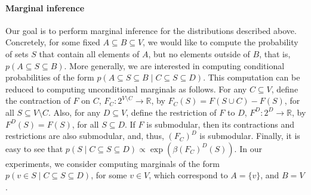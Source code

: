 \paragraph{Marginal inference}
Our goal is to perform marginal inference for the distributions described above.
Concretely, for some fixed $A \subseteq B \subseteq V$, we would like to compute the probability of sets $S$ that contain all elements of $A$, but no elements outside of $B$, that is, $p(A \subseteq S \subseteq B)$.
More generally, we are interested in computing conditional probabilities of the form $p(A \subseteq S \subseteq B \mid C \subseteq S \subseteq D)$.
This computation can be reduced to computing unconditional marginals as follows.
For any $C \subseteq V$, define the contraction of $F$ on $C$, $F_C : 2^{V \setminus C} \to \mathbb{R}$, by $F_C(S) = F(S \cup C) - F(S)$, for all $S \subseteq V \setminus C$.
Also, for any $D \subseteq V$, define the restriction of $F$ to $D$, $F^D : 2^D \to \mathbb{R}$, by $F^D(S) = F(S)$, for all $S \subseteq D$.
If $F$ is submodular, then its contractions and restrictions are also submodular, and, thus, $(F_C)^D$ is submodular.
Finally, it is easy to see that $p(S \mid C \subseteq S \subseteq D) \propto \exp(\beta (F_C)^D(S))$.
In our experiments, we consider computing marginals of the form $p(v \in S \mid C \subseteq S \subseteq D)$, for some $v \in V$, which correspond to $A = \{v\}$, and $B = V$.

%

